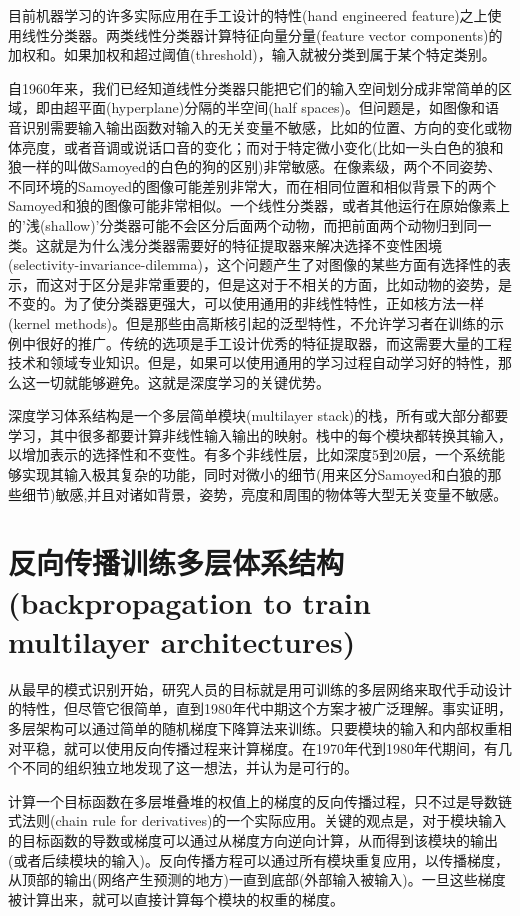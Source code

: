目前机器学习的许多实际应用在手工设计的特性(hand engineered feature)之上使用线性分类器。两类线性分类器计算特征向量分量(feature vector components)的加权和。如果加权和超过阈值(threshold)，输入就被分类到属于某个特定类别。

自1960年来，我们已经知道线性分类器只能把它们的输入空间划分成非常简单的区域，即由超平面(hyperplane)分隔的半空间(half spaces)。但问题是，如图像和语音识别需要输入输出函数对输入的无关变量不敏感，比如的位置、方向的变化或物体亮度，或者音调或说话口音的变化；而对于特定微小变化(比如一头白色的狼和狼一样的叫做Samoyed的白色的狗的区别)非常敏感。在像素级，两个不同姿势、不同环境的Samoyed的图像可能差别非常大，而在相同位置和相似背景下的两个Samoyed和狼的图像可能非常相似。一个线性分类器，或者其他运行在原始像素上的'浅(shallow)'分类器可能不会区分后面两个动物，而把前面两个动物归到同一类。这就是为什么浅分类器需要好的特征提取器来解决选择不变性困境(selectivity-invariance-dilemma)，这个问题产生了对图像的某些方面有选择性的表示，而这对于区分是非常重要的，但是这对于不相关的方面，比如动物的姿势，是不变的。为了使分类器更强大，可以使用通用的非线性特性，正如核方法一样(kernel methods)。但是那些由高斯核引起的泛型特性，不允许学习者在训练的示例中很好的推广。传统的选项是手工设计优秀的特征提取器，而这需要大量的工程技术和领域专业知识。但是，如果可以使用通用的学习过程自动学习好的特性，那么这一切就能够避免。这就是深度学习的关键优势。

深度学习体系结构是一个多层简单模块(multilayer stack)的栈，所有或大部分都要学习，其中很多都要计算非线性输入输出的映射。栈中的每个模块都转换其输入，以增加表示的选择性和不变性。有多个非线性层，比如深度5到20层，一个系统能够实现其输入极其复杂的功能，同时对微小的细节(用来区分Samoyed和白狼的那些细节)敏感,并且对诸如背景，姿势，亮度和周围的物体等大型无关变量不敏感。

\section{反向传播训练多层体系结构(backpropagation to train multilayer architectures)}
从最早的模式识别开始，研究人员的目标就是用可训练的多层网络来取代手动设计的特性，但尽管它很简单，直到1980年代中期这个方案才被广泛理解。事实证明，多层架构可以通过简单的随机梯度下降算法来训练。只要模块的输入和内部权重相对平稳，就可以使用反向传播过程来计算梯度。在1970年代到1980年代期间，有几个不同的组织独立地发现了这一想法，并认为是可行的。

计算一个目标函数在多层堆叠堆的权值上的梯度的反向传播过程，只不过是导数链式法则(chain rule for derivatives)的一个实际应用。关键的观点是，对于模块输入的目标函数的导数或梯度可以通过从梯度方向逆向计算，从而得到该模块的输出(或者后续模块的输入)。反向传播方程可以通过所有模块重复应用，以传播梯度，从顶部的输出(网络产生预测的地方)一直到底部(外部输入被输入)。一旦这些梯度被计算出来，就可以直接计算每个模块的权重的梯度。

